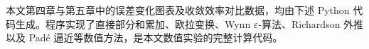 

本文第四章与第五章中的误差变化图表及收敛效率对比数据，均由下述 Python 代码生成。程序实现了直接部分和累加、欧拉变换、Wynn $\varepsilon$-算法、Richardson 外推以及 Padé 逼近等数值方法，是本文数值实验的完整计算代码。


